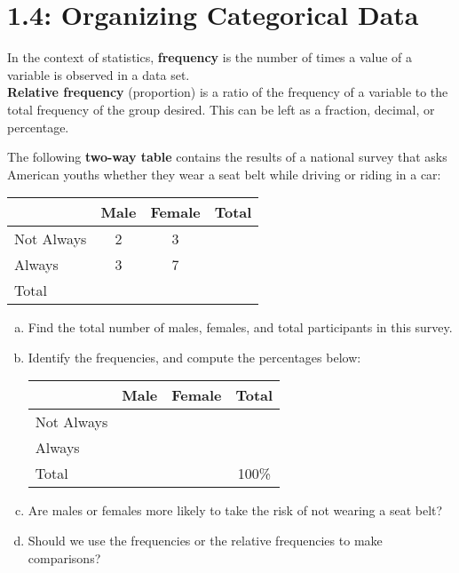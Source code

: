 \documentclass[../mathNotesPreamble]{subfiles}
\begin{document}
  \section{1.4: Organizing Categorical Data}
    \begin{defn*}
      In the context of statistics, \textbf{frequency} is the number of times a value of a variable is observed in a data set.\\
\textbf{Relative frequency} (proportion) is a ratio of the frequency of a variable to the total frequency of the group desired. This can be left as a fraction, decimal, or percentage.
    \end{defn*}

    \begin{ex*}
      The following \textbf{two-way table} contains the results of a national survey that asks American youths whether they wear a seat belt while driving or riding in a car:
    \end{ex*}
    \begin{center}
      \begin{tabular}{@{}l*{3}{c}@{}}\toprule
        & Male & Female & Total\\\midrule
        Not Always& 2& 3& \\
        Always& 3& 7& \\\midrule
        Total\\\bottomrule
      \end{tabular}
    \end{center}
    \begin{enumerate}[a)]
      \item Find the total number of males, females, and total participants in this survey.
      \item Identify the frequencies, and compute the percentages below:
        \begin{center}
          \hspace*{-30pt}
          \begin{tabular}{@{}l*{3}{c}@{}}\toprule
            & Male & Female & Total\\\midrule
            Not Always& & & \\
            Always& & & \\\midrule
            Total&&&100\%\\\bottomrule
          \end{tabular}
        \end{center}
      \item Are males or females more likely to take the risk of not wearing a seat belt?\\[\stretch{1}]
      \item Should we use the frequencies or the relative frequencies to make comparisons?
    \end{enumerate}

  \pagebreak
\end{document}

